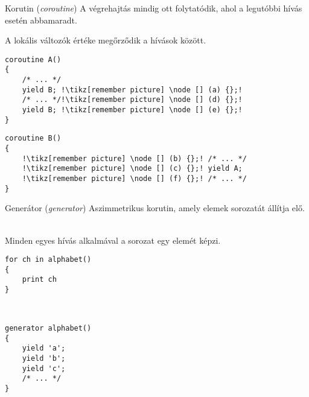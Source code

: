 \begin{frame}[fragile]{Korutin (\textit{coroutine})}
A végrehajtás mindig ott folytatódik, ahol a legutóbbi hívás esetén abbamaradt.

A lokális változók értéke megőrződik a hívások között.
\\
\begin{center}
\begin{minipage}{.40\textwidth}
\begin{lstlisting}[escapechar=!, keywords={coroutine, yield}]
coroutine A()
{
    /* ... */
    yield B; !\tikz[remember picture] \node [] (a) {};!
    /* ... */!\tikz[remember picture] \node [] (d) {};!
    yield B; !\tikz[remember picture] \node [] (e) {};!
}
\end{lstlisting}
\end{minipage}\hfill
\begin{minipage}{.50\textwidth}
\begin{lstlisting}[escapechar=!, showlines=true, keywords={coroutine, yield}]
coroutine B()
{
    !\tikz[remember picture] \node [] (b) {};! /* ... */
    !\tikz[remember picture] \node [] (c) {};! yield A; 
    !\tikz[remember picture] \node [] (f) {};! /* ... */
}

\end{lstlisting}
\end{minipage}
\end{center}
\par
\end{frame}


\begin{frame}[fragile]{Generátor (\textit{generator})}
Aszimmetrikus korutin, amely elemek sorozatát állítja elő.

\hfill \\

Minden egyes hívás alkalmával a sorozat egy elemét képzi.

\begin{center}
\begin{minipage}{.40\textwidth}
\begin{lstlisting}[escapechar=!, showlines=true, keywords={for, in, print}]
for ch in alphabet()
{
    print ch
}



\end{lstlisting}
\end{minipage}\hfill
\begin{minipage}{.50\textwidth}
\begin{lstlisting}[escapechar=!, showlines=true, keywords={generator, yield}]
generator alphabet()
{
    yield 'a';
    yield 'b';
    yield 'c';
    /* ... */
}
\end{lstlisting}
\end{minipage}
\end{center}
\par
\end{frame}